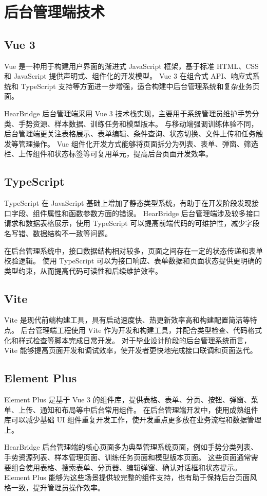 
\section{后台管理端技术}

\subsection{Vue 3}

Vue 是一种用于构建用户界面的渐进式 JavaScript 框架，基于标准 HTML、CSS 和 JavaScript 提供声明式、组件化的开发模型\cite{vue-docs}。
Vue 3 在组合式 API、响应式系统和 TypeScript 支持等方面进一步增强，适合构建中后台管理系统和复杂业务页面。

HearBridge 后台管理端采用 Vue 3 技术栈实现，主要用于系统管理员维护手势分类、手势资源、样本数据、训练任务和模型版本。
与移动端强调训练体验不同，后台管理端更关注表格展示、表单编辑、条件查询、状态切换、文件上传和任务触发等管理操作。
Vue 组件化开发方式能够将页面拆分为列表、表单、弹窗、筛选栏、上传组件和状态标签等可复用单元，提高后台页面开发效率。

\subsection{TypeScript}

TypeScript 在 JavaScript 基础上增加了静态类型系统，有助于在开发阶段发现接口字段、组件属性和函数参数方面的错误。
HearBridge 后台管理端涉及较多接口请求和数据表格展示，使用 TypeScript 可以提高前端代码的可维护性，减少字段名写错、数据结构不一致等问题。

在后台管理系统中，接口数据结构相对较多，页面之间存在一定的状态传递和表单校验逻辑。
使用 TypeScript 可以为接口响应、表单数据和页面状态提供更明确的类型约束，从而提高代码可读性和后续维护效率。

\subsection{Vite}

Vite 是现代前端构建工具，具有启动速度快、热更新效率高和构建配置简洁等特点。
后台管理端工程使用 Vite 作为开发和构建工具，并配合类型检查、代码格式化和样式检查等脚本完成日常开发。
对于毕业设计阶段的后台管理系统而言，Vite 能够提高页面开发和调试效率，使开发者更快地完成接口联调和页面迭代。

\subsection{Element Plus}

Element Plus 是基于 Vue 3 的组件库，提供表格、表单、分页、按钮、弹窗、菜单、上传、通知和布局等中后台常用组件\cite{element-plus-docs}。
在后台管理端开发中，使用成熟组件库可以减少基础 UI 组件重复开发工作，使开发重点更多放在业务流程和数据管理上。

HearBridge 后台管理端的核心页面多为典型管理系统页面，例如手势分类列表、手势资源列表、样本管理页面、训练任务页面和模型版本页面。
这些页面通常需要组合使用表格、搜索表单、分页器、编辑弹窗、确认对话框和状态提示。
Element Plus 能够为这些场景提供较完整的组件支持，也有助于保持后台页面风格一致，提升管理员操作效率。
